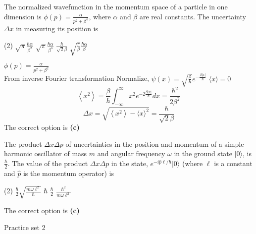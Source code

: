 \begin{enumerate}
\begin{minipage}{\textwidth}
	\item The normalized wavefunction in the momentum space of a particle in one dimension is $\phi(p)=\frac{\alpha}{p^{2}+\beta^{2}}$, where $\alpha$ and $\beta$ are real constants. The uncertainty $\Delta x$ in measuring its position is
\end{minipage}
\begin{tasks}(2)
	\task[\textbf{A.}] $\sqrt{\pi} \frac{\hbar \alpha}{\beta^{2}}$
	\task[\textbf{B.}]$\sqrt{\pi} \frac{\hbar \alpha}{\beta^{3}}$
	\task[\textbf{C.}]$\frac{\hbar}{\sqrt{2} \beta}$
	\task[\textbf{D.}]$\sqrt{\frac{\pi}{\beta}} \frac{\hbar \alpha}{\beta}$
\end{tasks}
\begin{answer}
	$\phi(p)=\frac{\alpha}{p^{2}+\beta^{2}}$\\
	From inverse Fourier transformation
	Normalize, $\psi(x)=\sqrt{\frac{\beta}{\hbar}} e^{-\frac{\beta|x|}{\hbar}}$
	$\langle x\rangle=0$
	$$
	\left\langle x^{2}\right\rangle=\frac{\beta}{h} \int_{-\infty}^{\infty} x^{2} e^{-2 \frac{\beta|x|}{\hbar}} d x=\frac{\hbar^{2}}{2 \beta^{2}}
	$$
	$$
	\Delta x=\sqrt{\left\langle x^{2}\right\rangle-\langle x\rangle^{2}}=\frac{\hbar}{\sqrt{2} \beta}
	$$
	The correct option is \textbf{(c)}
\end{answer}
\begin{minipage}{\textwidth}
	\item The product $\Delta x \Delta p$ of uncertainties in the position and momentum of a simple harmonic oscillator of mass $m$ and angular frequency $\omega$ in the ground state $|0\rangle$, is $\frac{\hbar}{2}$. The value of the product $\Delta x \Delta p$ in the state, $e^{-i \hat{p} \ell / \hbar}|0\rangle$ (where $\ell$ is a constant and $\hat{p}$ is the momentum operator) is
\end{minipage}
\begin{tasks}(2)
	\task[\textbf{A.}] $\frac{\hbar}{2} \sqrt{\frac{m \omega \ell^{2}}{\hbar}}$
	\task[\textbf{B.}]$\hbar$
	\task[\textbf{C.}] $\frac{\hbar}{2}$
	\task[\textbf{D.}] $\frac{\hbar^{2}}{m \omega \ell^{2}}$
\end{tasks}
\begin{answer}
	The correct option is \textbf{(c)}
\end{answer}
\end{enumerate}
\newpage
\begin{abox}
	Practice set 2
\end{abox}
